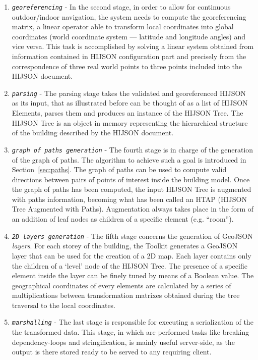 \begin{enumerate}
\item
 \textit{\texttt{georeferencing}} - In the second stage, in order to allow
 for continuous outdoor/indoor navigation, the system needs to compute
 the georeferencing matrix, a linear operator able to transform local
 coordinates into global coordinates (world coordinate
 system --- latitude and longitude angles) and vice versa. This task is
 accomplished by solving a linear system obtained from information
 contained in HIJSON configuration part and precisely from the
 correspondence of three real world points to three points included
 into the HIJSON document.
\item
 \textit{\texttt{parsing}} - The parsing stage takes the validated and
 georeferenced HIJSON as its input, that as illustrated before can be
 thought of as a list of HIJSON Elements, parses them and produces an
 instance of the HIJSON Tree. The HIJSON Tree is an object in memory
 representing the hierarchical structure of the building described
 by the HIJSON document.
\item
 \textit{\texttt{graph of paths generation}} - The fourth stage is in char\-ge
 of the generation of the graph of paths. The algorithm to achieve such a 
 goal is introduced in Section~\ref{sec:paths}. The graph of paths can be used to compute valid directions between pairs of points of
 interest inside the building model. Once the graph of paths has been computed, the
 input HIJSON Tree is augmented with paths information, becoming what
 has been called an HTAP (HIJSON Tree Augmented with Paths).
 Augmentation always takes place in the form of an addition of leaf nodes as children of a
 specific element (e.g. ``room'').
\item
 \textit{\texttt{2D layers generation}} - The fifth stage concerns the
 generation of GeoJSON \emph{layers}. For each storey of the building, the Toolkit generates a
 GeoJSON layer that can be used for the creation of a 2D map. Each layer
 contains only the children of a `level' node of the HIJSON Tree. 
 The presence of a specific element inside the layer can be finely tuned 
 by means of a Boolean value. The geographical coordinates of every elements
 are calculated by a series of multiplications between transformation matrixes obtained 
 during the tree traversal to the local coordinates.
\item
 \textit{\texttt{marshalling}} - The last stage is responsible for executing
 a serialization of the the transformed data. This stage, in which are performed tasks like breaking
 dependency-loops and stringification, is
 mainly useful  server-side, as the output is there stored ready to be
 served to any requiring client.
\end{enumerate}

